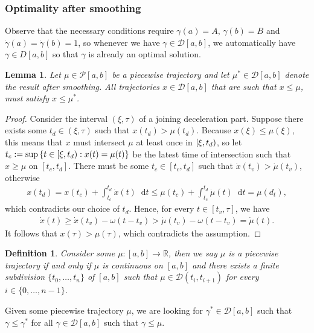 \documentclass[a4paper]{article}
\theoremstyle{definition}
\theoremstyle{plain}
\newtheorem{define}{Definition\hspace{0.25em}\ignorespaces}
\newtheorem{lemma}{Lemma\hspace{0.25em}\ignorespaces}
\newcommand*\diff{\mathop{}\!\mathrm{d}}
\begin{document}
\subsubsection{Optimality after smoothing}


{\color{Navy} Observe that the necessary conditions require $\gamma(a) = A$,
  $\gamma(b) = B$ and $\dot{\gamma}(a) = \dot{\gamma}(b) = 1$, so whenever we
  have $\gamma \in \mathcal{D}[a, b]$, we automatically have $\gamma \in D[a,b]$
  so that $\gamma$ is already an optimal solution. }

\begin{lemma}\label{lemma:upperbound}
  Let $\mu \in \mathcal{P}[a,b]$ be a piecewise trajectory and let
  $\mu^{*} \in \mathcal{D}[a,b]$ denote the result after smoothing. All
  trajectories $x \in \mathcal{D}[a, b]$ that are such that
  $x \leq \mu$, must satisfy $x \leq \mu^{*}$.
\end{lemma}
\begin{proof}
  Consider the interval $(\xi, \tau)$ of a joining deceleration part. Suppose
  there exists some $t_{d} \in (\xi, \tau)$ such that
  $x(t_{d}) > \mu(t_{d})$. Because $x(\xi) \leq \mu(\xi)$, this means
  that $x$ must intersect $\mu$ at least once in $[\xi,t_{d})$,
  so let
  $t_{c} := \sup \, \{ t \in [\xi,t_{d}) : x(t) = \mu(t) \}$ be
  the latest time of intersection such that $x \geq \mu$ on
  $[t_{c}, t_{d}]$. There must be some $t_{c} \in [t_{c}, t_{d}]$ such that
  $\dot{x}(t_{v}) > \dot{\mu}(t_{v})$, otherwise
  \begin{align*}
    x(t_{d}) = x(t_{c}) + \int_{t_{c}}^{t_{d}} \dot{x}(t) \diff t \leq \mu(t_{c}) + \int_{t_{c}}^{t_{d}} \dot{\mu}(t) \diff t = \mu(d_{t}) ,
  \end{align*}
  which contradicts our choice of $t_{d}$. Hence, for every
  $t \in [t_{v}, \tau]$, we have
  \begin{align*}
    \dot{x}(t) \geq \dot{x}(t_{v}) - \omega (t - t_{v}) > \dot{\mu}(t_{v}) - \omega(t - t_{v}) = \dot{\mu}(t) .
  \end{align*}
  It follows that $x(\tau) > \mu(\tau)$, which contradicts the assumption.
\end{proof}

\newpage

\begin{define}
  Consider some $\mu : [a, b] \rightarrow \mathbb{R}$, then we say $\mu$ is a
  \emph{piecewise trajectory} if and only if $\mu$ is continuous on $[a,b]$ and
  there exists a finite subdivision $\{t_{0}, \dots, t_{n}\}$ of $[a, b]$ such
  that $\mu \in \mathcal{D} (t_{i}, t_{i+1})$ for every
  $i \in \{ 0, \dots, n-1\}$.
\end{define}
%
Given some piecewise trajectory $\mu$, we are looking for
$\gamma^{*} \in \mathcal{D}[a, b]$ such that $\gamma \leq \gamma^{*}$ for all
$\gamma \in \mathcal{D}[a, b]$ such that $\gamma \leq \mu$.
\end{document}
